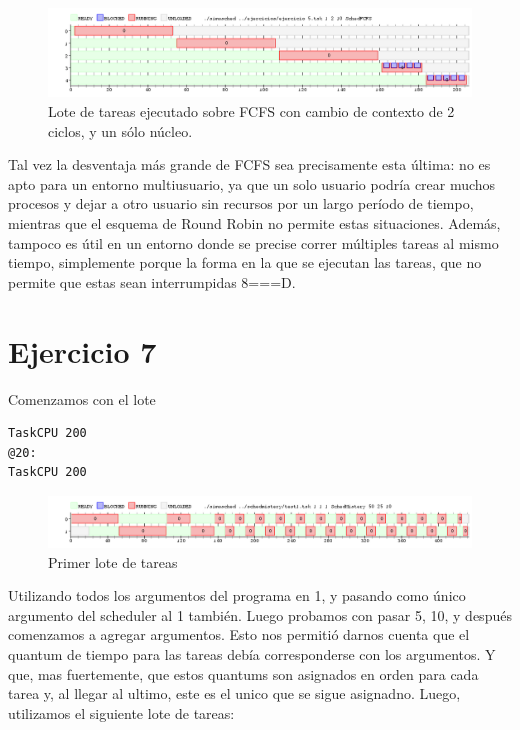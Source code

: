 \documentclass{article}
\begin{document}
\begin{figure}[h!]
\caption{Lote de tareas ejecutado sobre FCFS con cambio de contexto de 2 ciclos, y un sólo núcleo. \label{grf:ex6-1}}
\centering
\includegraphics[width=15cm]{../ejercicios/ejercicio 6 - quantum 2}
\end{figure}

Tal vez la desventaja más grande de FCFS sea precisamente esta última: no es apto para un entorno multiusuario, ya que un solo usuario podría crear muchos procesos y dejar a otro usuario sin recursos por un largo período de tiempo, mientras que el esquema de Round Robin no permite estas situaciones. Además, tampoco es útil en un entorno donde se precise correr múltiples tareas al mismo tiempo, simplemente porque la forma en la que se ejecutan las tareas, que no permite que estas sean interrumpidas 8===D.

\section{Ejercicio 7}

Comenzamos con el lote

\begin{verbatim}
TaskCPU 200
@20:
TaskCPU 200
\end{verbatim}

\begin{figure}[h!]
\caption{Primer lote de tareas \label{grf:ex7-1}}
\centering
\includegraphics[width=15cm]{../ejercicios/ejercicio 7-1}
\end{figure}

Utilizando todos los argumentos del programa en 1, y pasando como único argumento del scheduler al 1 también. Luego probamos con pasar 5, 10, y después comenzamos a agregar argumentos. Esto nos permitió darnos cuenta que el quantum de tiempo para las tareas debía corresponderse con los argumentos. Y que, mas fuertemente, que estos quantums son asignados en orden para cada tarea y, al llegar al ultimo, este es el unico que se sigue asignadno. Luego, utilizamos el siguiente lote de tareas:
\end{document}
